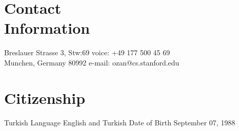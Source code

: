 \documentclass[margin,line,10pt]{resume}
\begin{document}
\begin{resume}

    \section{\mysidestyle \textcolor{olgray}{Contact\\Information}}
    Breslauer Strasse 3, Stw:69        \hfill voice: +49 177 500 45 69          \vspace{0mm}\\\vspace{0mm}%
    Munchen, Germany 80992 \hfill e-mail: ozan@cs.stanford.edu \vspace{0mm}\\\vspace{0mm}%



%

%

\section{\mysidestyle \textcolor{olgray}{Citizenship}} Turkish \hspace{13.9mm} {\mysidestyle \textcolor{olgray}{Language}} \hspace{3.56mm} English and Turkish \hfill {\mysidestyle \textcolor{olgray}{Date of Birth}}  \hspace{3.56mm} September 07, 1988

\end{resume}
\end{document}
